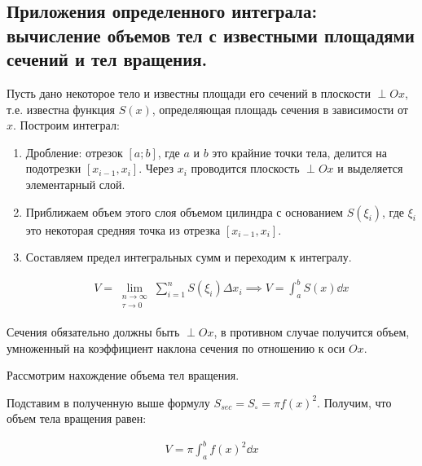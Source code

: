 \subsection{%
  Приложения определенного интеграла: вычисление объемов тел с известными
  площадями сечений и тел вращения.%
}

Пусть дано некоторое тело и известны площади его сечений в плоскости
\(\perp Ox\), т.е. известна функция \(S(x)\), определяющая площадь сечения в
зависимости от \(x\). Построим интеграл:

\begin{enumerate}
  \item Дробление: отрезок \([a; b]\), где \(a\) и \(b\) это крайние точки тела,
    делится на подотрезки \([x_{i - 1}, x_{i}]\). Через \(x_{i}\) проводится
    плоскость \(\perp Ox\) и выделяется элементарный слой.

  \item Приближаем объем этого слоя объемом цилиндра с основанием
  \(S(\xi_{i})\), где \(\xi_{i}\) это некоторая средняя точка из отрезка
  \([x_{i - 1}, x_{i}]\).

  \item Составляем предел интегральных сумм и переходим к интегралу.
  
  \begin{align*}\label{eq:rotate-int-V}\tag{RV}
    V = \lim_{\substack{n \to \infty \\ \tau \to 0}}
      \sum_{i = 1}^{n} S(\xi_{i}) \Delta x_{i}
    \implies
    V = \int_{a}^{b} S(x) \dd x
  \end{align*}
\end{enumerate}

\begin{remark}
  Сечения обязательно должны быть \(\perp Ox\), в противном случае получится
  объем, умноженный на коэффициент наклона сечения по отношению к оси \(Ox\).
\end{remark}

Рассмотрим нахождение объема тел вращения.

Подставим в полученную выше формулу \(S_{sec} = S_{\circ} = \pi f(x)^2\).
Получим, что объем тела вращения равен:

\begin{align*}
  V = \pi \int_{a}^{b} f(x)^2 \dd x
\end{align*}
